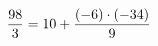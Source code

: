 \documentclass[preview]{standalone}
\begin{document}
\begin{align*}
\special{dvisvgm:raw <g id='unique000'>}\frac{98}{3} = 10 + \frac{(-6) \cdot (-34)}{9}\special{dvisvgm:raw </g>}
\end{align*}
\end{document}
